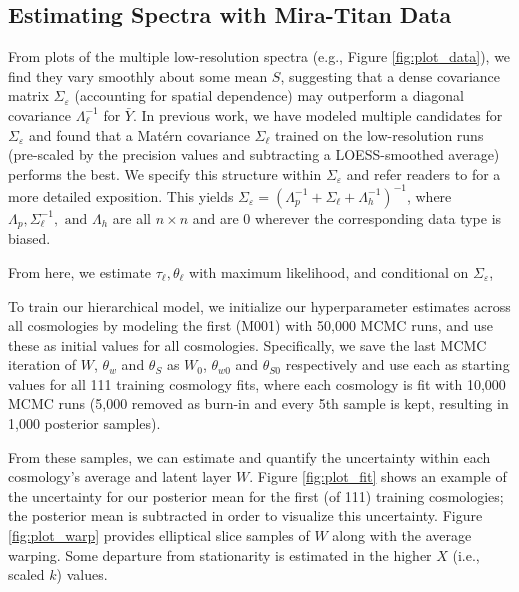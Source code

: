 \documentclass[11pt]{article}
\begin{document}
\subsection{Estimating Spectra with Mira-Titan Data}
\label{subsec:mira_fit}

From plots of the multiple low-resolution spectra (e.g., Figure \ref{fig:plot_data}), 
we find they vary smoothly about some mean $S$, suggesting that a dense covariance 
matrix $\Sigma_\varepsilon$ (accounting for spatial dependence) may outperform a 
diagonal covariance $\Lambda_\ell^{-1}$ for $\bar Y$. In previous work, we have 
modeled multiple candidates for $\Sigma_\varepsilon$ \citep{walsh2023bayesian} and 
found that a Mat\'ern covariance $\Sigma_\ell$ trained on the low-resolution runs 
(pre-scaled by the precision values and subtracting a LOESS-smoothed average) performs 
the best. We specify this structure within $\Sigma_\varepsilon$ and refer readers 
to \cite{walsh2023bayesian} for a more detailed exposition. This yields 
$\Sigma_\varepsilon=\left(\Lambda_p^{-1} + \Sigma_\ell + \Lambda_h^{-1}\right)^{-1}$, 
where $\Lambda_p, \Sigma_\ell^{-1}, \text{ and } \Lambda_h$ are all $n\times n$ 
and are 0 wherever the corresponding data type is biased.

From here, we estimate $\tau_\ell, \theta_\ell$ with maximum 
likelihood, and conditional on $\Sigma_\varepsilon$,

To train our hierarchical model, we initialize our hyperparameter estimates across 
all cosmologies by modeling the first (M001) with 50,000 MCMC runs, and use these 
as initial values for all cosmologies. Specifically, we save the last MCMC 
iteration of $W$, $\theta_w$ and $\theta_S$ as $W_0$, $\theta_{w0}$ and $\theta_{S0}$ 
respectively and use each as starting values for all 111 training cosmology fits, 
where each cosmology is fit with 10,000 MCMC runs (5,000 removed as burn-in and 
every 5th sample is kept, resulting in 1,000 posterior samples).

From these samples, we can estimate and quantify the uncertainty within each 
cosmology's average and latent layer $W$. Figure \ref{fig:plot_fit} shows an 
example of the uncertainty for our posterior mean for the first (of 111) training 
cosmologies; the posterior mean is subtracted in order to visualize this uncertainty. 
Figure \ref{fig:plot_warp} provides elliptical slice samples of $W$ along with the 
average warping. Some departure from stationarity is estimated in the higher $X$ 
(i.e., scaled $k$) values.
\end{document}
